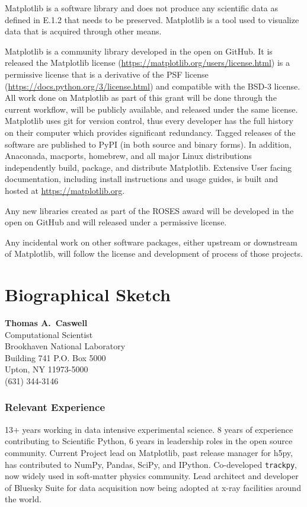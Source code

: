 \documentclass[12pt]{article}
\numberwithin{page}{section}
\begin{document}
Matplotlib is a software library and does not produce any scientific
data as defined in E.1.2 that needs to be preserved.  Matplotlib is a
tool used to visualize data that is acquired through other means.

Matplotlib is a community library developed in the open on GitHub.
It is released the Matplotlib license
(\url{https://matplotlib.org/users/license.html}) is a permissive
license that is a derivative of the PSF license
(\url{https://docs.python.org/3/license.html}) and compatible with the
BSD-3 license.  All work done on Matplotlib as part of this grant will
be done through the current workflow, will be publicly available, and
released under the same license.  Matplotlib uses git for version
control, thus every developer has the full history on their computer
which provides significant redundancy.  Tagged releases of the
software are published to PyPI (in both source and binary forms).  In
addition, Anaconada, macports, homebrew, and all major Linux
distributions independently build, package, and distribute Matplotlib.
Extensive User facing documentation, including install instructions
and usage guides, is built and hosted at \url{https://matplotlib.org}.

Any new libraries created as part of the ROSES award will be developed
in the open on GitHub and will released under a permissive license.

Any incidental work on other software packages, either upstream or
downstream of Matplotlib, will follow the license and development of
process of those projects.


\newpage
\section{Biographical Sketch}
\setcounter{page}{1}
\begin{center}
  \textbf{Thomas A.\ Caswell}\\
  Computational Scientist\\
  Brookhaven National Laboratory\\
  Building 741 P.O. Box 5000\\
  Upton, NY 11973-5000\\
  (631) 344-3146\\
\end{center}

\subsubsection*{Relevant Experience}
13+ years working in data intensive experimental science.  8 years of
experience contributing to Scientific Python, 6 years in leadership
roles in the open source community.  Current Project lead on
Matplotlib, past release manager for h5py, has contributed to NumPy,
Pandas, SciPy, and IPython.  Co-developed \texttt{trackpy}, now widely
used in soft-matter physics community.  Lead architect and developer
of Bluesky Suite for data acquisition now being adopted at x-ray
facilities around the world.
\end{document}
